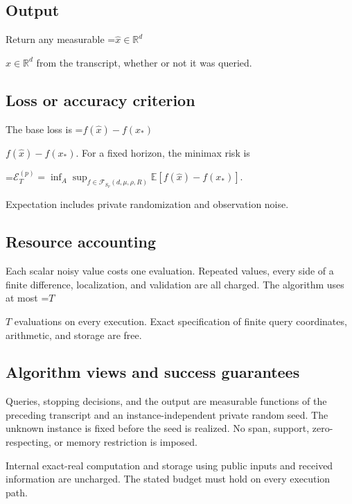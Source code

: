 \documentclass[10pt,a4paper]{article}
\newcommand{\AtlasMath}[1]{\par\begingroup\centering\setbox0=\hbox{$\displaystyle #1$}\ifdim\wd0>1.4\linewidth\typeout{ATLAS WIDE FORMULA: \the\wd0}\fi\ifdim\wd0>\linewidth\resizebox{\linewidth}{!}{\box0}\else\box0\fi\par\endgroup}
\newcommand{\AtlasInlineMath}[1]{\begingroup\setbox0=\hbox{$#1$}\ifdim\wd0>.4\linewidth\endgroup\AtlasMath{#1}\else\endgroup$#1$\fi}
\begin{document}
\subsection{Output}


Return any measurable \AtlasInlineMath{\widehat x\in\mathbb R^d} from the transcript, whether or not it was queried.



\subsection{Loss or accuracy criterion}


The base loss is \AtlasInlineMath{f(\widehat x)-f(x_*)}. For a fixed horizon, the minimax risk is
\AtlasMath{\mathcal E_T^{(p)}=\inf_A\sup_{f\in\mathcal F_{S_p}(d,\mu,\rho,R)}\mathbb E[f(\widehat x)-f(x_*)].}
 Expectation includes private randomization and observation noise.



\subsection{Resource accounting}


Each scalar noisy value costs one evaluation. Repeated values, every side of a finite difference, localization, and validation are all charged. The algorithm uses at most \AtlasInlineMath{T} evaluations on every execution. Exact specification of finite query coordinates, arithmetic, and storage are free.



\subsection{Algorithm views and success guarantees}


Queries, stopping decisions, and the output are measurable functions of the preceding transcript and an instance-independent private random seed. The unknown instance is fixed before the seed is realized. No span, support, zero-respecting, or memory restriction is imposed.



Internal exact-real computation and storage using public inputs and received information are uncharged. The stated budget must hold on every execution path.
\end{document}
